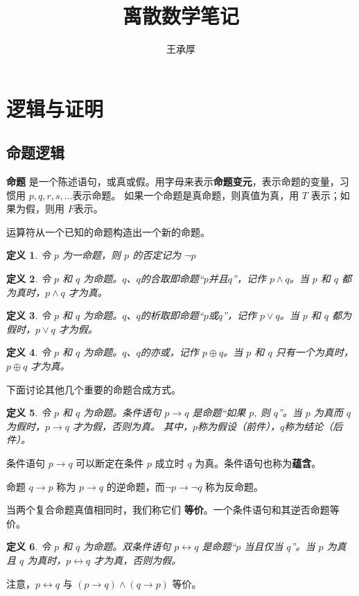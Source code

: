 \documentclass{ctexart}
\title{离散数学笔记}
\author{王承厚}
\newtheorem{definition}{\indent 定义}[section]
\begin{document}
\maketitle
\section{逻辑与证明}
\subsection{命题逻辑}
\textbf{命题} 是一个陈述语句，或真或假。用字母来表示\textbf{命题变元}，表示命题的变量，习惯用 $p, q, r, s, \ldots $表示命题。
如果一个命题是真命题，则真值为真，用 $T$ 表示；如果为假，则用 $F$表示。

运算符从一个已知的命题构造出一个新的命题。
\begin{definition}
    令 $p$ 为一命题，则 $p$ 的否定记为 $\lnot p$
\end{definition}
\begin{definition}
    令 $p$ 和 $q$ 为命题。$q$、$q$的合取即命题“$p$并且$q$”，记作 $p \land q$。当 $p$ 和 $q$ 都为真时，$p \land q$ 才为真。
\end{definition}
\begin{definition}
    令 $p$ 和 $q$ 为命题。$q$、$q$的析取即命题“$p$或$q$”，记作 $p \lor q$。当 $p$ 和 $q$ 都为假时，$p \lor q$ 才为假。
\end{definition}
\begin{definition}
    令 $p$ 和 $q$ 为命题。$q$、$q$的亦或，记作 $p \oplus  q$。当 $p$ 和 $q$ 只有一个为真时，$p \oplus q$ 才为真。
\end{definition}
下面讨论其他几个重要的命题合成方式。
\begin{definition}
    令 $p$ 和 $q$ 为命题。条件语句 $p \rightarrow q$ 是命题“如果 $p$, 则 $q$”。当 $p$ 为真而 $q$ 为假时，$p \rightarrow q$ 才为假，否则为真。
    其中，$p$称为假设（前件），$q$称为结论（后件）。
\end{definition}
条件语句 $p \rightarrow q$ 可以断定在条件 $p$ 成立时 $q$ 为真。条件语句也称为\textbf{蕴含}。

命题 $q \rightarrow p$ 称为 $p \rightarrow q$ 的逆命题，而$\lnot p \rightarrow \lnot q$ 称为反命题。

当两个复合命题真值相同时，我们称它们 \textbf{等价}。一个条件语句和其逆否命题等价。

\begin{definition}
    令 $p$ 和 $q$ 为命题。双条件语句 $p \leftrightarrow  q$ 是命题“$p$ 当且仅当 $q$”。当 $p$ 为真且 $q$ 为真时，$p \leftrightarrow q$ 才为真，否则为假。
\end{definition}
注意，$p \leftrightarrow q$ 与 $(p \rightarrow q) \land (q \rightarrow p)$ 等价。
\end{document}
